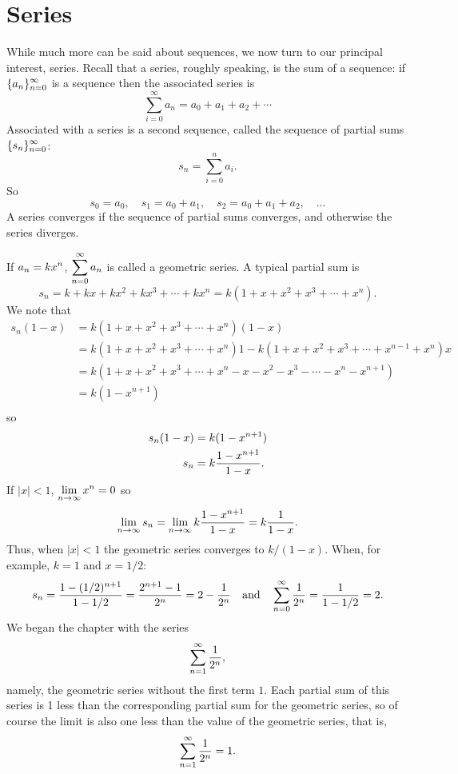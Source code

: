 \chapter{Series}{}{}

\nobreak
While much more can be said about sequences, we now turn to our
principal interest, series. Recall that a series, roughly speaking, is
the sum of a sequence: if $\displaystyle\{a_n\}_{n=0}^\infty$ is a sequence then the
associated series is
$$\sum_{i=0}^\infty a_n=a_0+a_1+a_2+\cdots$$
Associated with a series is a second sequence, called the {\dfont sequence of
  partial sums\/} 
$\displaystyle\{s_n\}_{n=0}^\infty$:
$$s_n=\sum_{i=0}^n a_i.$$
So
$$s_0=a_0,\quad s_1=a_0+a_1,\quad s_2=a_0+a_1+a_2,\quad \ldots$$
A series converges 
if the sequence of partial sums converges, and otherwise the series 
diverges.

\begin{example}
If $\displaystyle a_n=kx^n$, $\displaystyle\sum_{n=0}^\infty a_n$ is called a 
{\dfont geometric series\/}.
A typical partial sum is
$$s_n=k+kx+kx^2+kx^3+\cdots+kx^n=k(1+x+x^2+x^3+\cdots+x^n).$$
We note that
\begin{align*}
  s_n(1-x)&=k(1+x+x^2+x^3+\cdots+x^n)(1-x) \\
  &=k(1+x+x^2+x^3+\cdots+x^n)1-k(1+x+x^2+x^3+\cdots+x^{n-1}+x^n)x \\
  &=k(1+x+x^2+x^3+\cdots+x^n-x-x^2-x^3-\cdots-x^n-x^{n+1}) \\
  &=k(1-x^{n+1}) \\
\end{align*}
so
\begin{align*}
  s_n(1-x)&=k(1-x^{n+1}) \\
  s_n&=k{1-x^{n+1}\over 1-x}. \\
\end{align*}
If $|x|<1$, $\displaystyle\lim_{n\to\infty}x^n=0$ so
$$
  \lim_{n\to\infty}s_n=\lim_{n\to\infty}k{1-x^{n+1}\over 1-x}=
  k{1\over 1-x}.
$$ 
Thus, when $|x|<1$ the geometric series converges to $k/(1-x)$. When, for
  example, $k=1$ and $x=1/2$:
$$
  s_n={1-(1/2)^{n+1}\over 1-1/2}={2^{n+1}-1\over 2^n}=2-{1\over 2^n}
  \hbox{\quad and\quad } \sum_{n=0}^\infty {1\over 2^n} = 
  {1\over 1-1/2} = 2.
$$
We began the chapter with the series
$$\sum_{n=1}^\infty {1\over 2^n},$$
namely, the geometric series without the first term $1$. Each partial
sum of this series is 1 less than the corresponding partial sum for 
the geometric series, so of course the limit is also one less than the
value of the geometric series, that is,
$$\sum_{n=1}^\infty {1\over 2^n}=1.$$
\vskip-10pt\end{example}

